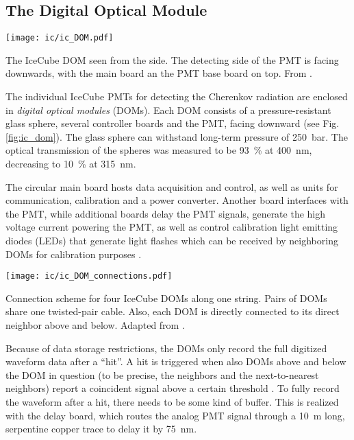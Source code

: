 \subsection{The Digital Optical Module} \label{DOM}
\begin{marginfigure}
    \texttt{[image: ic/ic\_DOM.pdf]}
    \caption[IceCube digital optical module]{The IceCube DOM seen from the side. The detecting side of the PMT is facing downwards, with the main board an the PMT base board on top. From \cite{Aartsen2017}.}
\end{marginfigure}
The individual IceCube PMTs for detecting the Cherenkov radiation are enclosed in \textit{digital optical modules} (DOMs). Each DOM consists of a pressure-resistant glass sphere, several controller boards and the PMT, facing downward (see Fig. \ref{fig:ic_dom}). The glass sphere can withstand long-term pressure of \SI{250}{\bar}. The optical transmission of the spheres was measured to be \SI{93}{\percent} at \SI{400}{\nm}, decreasing to \SI{10}{\percent} at \SI{315}{\nm}.

The circular main board hosts data acquisition and control, as well as units for communication, calibration and a power converter. Another board interfaces with the PMT, while additional boards delay the PMT signals, generate the high voltage current powering the PMT, as well as control calibration light emitting diodes (LEDs) that generate light flashes which can be received by neighboring DOMs for calibration purposes .
\begin{marginfigure}
    \texttt{[image: ic/ic\_DOM\_connections.pdf]}
    \caption[IceCube DOM connections]{Connection scheme for four IceCube DOMs along one string. Pairs of DOMs share one twisted-pair cable. Also, each DOM is directly connected to its direct neighbor above and below. Adapted from \cite{Aartsen2017}.} 
\end{marginfigure}
Because of data storage restrictions, the DOMs only record the full digitized waveform data after a ``hit''. A hit is triggered when also DOMs above and below the DOM in question (to be precise, the neighbors and the next-to-nearest neighbors) report a coincident signal above a certain threshold \cite{Aartsen2017}. To fully record the waveform after a hit, there needs to be some kind of buffer. This is realized with the delay board, which routes the analog PMT signal through a \SI{10}{\m} long, serpentine copper trace to delay it by \SI{75}{\nm}.

